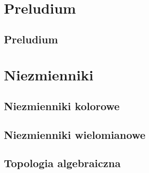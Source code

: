 \documentclass{LegrandOrangeBook}
\begin{document}





\tableofcontents



\pagestyle{fancy} %
\cleardoublepage %

\chapterspaceabove{5.75cm} %
\chapterspacebelow{7.25cm} %

\part{Preludium}
\chapter{Preludium}







\part{Niezmienniki}
\chapter{Niezmienniki kolorowe}





\chapter{Niezmienniki wielomianowe}








\chapter{Topologia algebraiczna}





\end{document}
